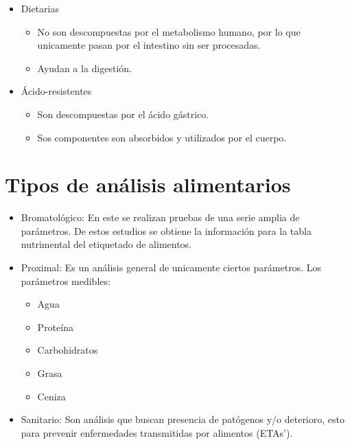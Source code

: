 \begin{itemize}
    \item Dietarias
        \begin{itemize}
	        \item No son descompuestas por el metabolismo humano, por lo que unicamente pasan por el intestino sin ser procesadas.
	        \item Ayudan a la digestión.
        \end{itemize}
        
    \item Ácido-resistentes
        \begin{itemize}
	        \item Son descompuestas por el ácido gástrico.
	        \item Sos componentes son absorbidos y utilizados por el cuerpo.
        \end{itemize}
\end{itemize}

\section{Tipos de análisis alimentarios}



\begin{itemize}
    \item Bromatológico: En este se realizan pruebas de una serie amplia de parámetros. De estos estudios se obtiene la información para la tabla nutrimental del etiquetado de alimentos.
    \item Proximal: Es un análisis general de unicamente ciertos parámetros. Los parámetros medibles:
        \begin{itemize}
		    \item Agua
		    \item Proteína
		    \item Carbohidratos
		    \item Grasa
		    \item Ceniza
	    \end{itemize}
    \item Sanitario: Son análisis que buscan presencia de patógenos y/o deterioro, esto para prevenir enfermedades transmitidas por alimentos (ETAs').
\end{itemize}